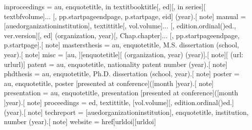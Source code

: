 \documentclass[letterpaper,10pt,english]{sphinxmanual}
\begin{document}
\begin{sphinxVerbatim}[commandchars=\\\{\}]
inproceedings = \PYGZlt{}au\PYGZgt{}, \PYGZbs{}enquote\PYGZob{}\PYGZlt{}title\PYGZgt{},\PYGZcb{} in \PYGZbs{}textit\PYGZob{}\PYGZlt{}booktitle\PYGZgt{}\PYGZcb{}[, \PYGZlt{}ed\PYGZgt{}][, in \PYGZlt{}series\PYGZgt{}][ \PYGZbs{}textbf\PYGZob{}\PYGZlt{}volume\PYGZgt{}\PYGZcb{}]...
        [, pp.\PYGZti{}\PYGZlt{}startpage\PYGZgt{}\PYGZhy{}\PYGZhy{}\PYGZlt{}endpage\PYGZgt{}\textbar{}, p.\PYGZti{}\PYGZlt{}startpage\PYGZgt{}\textbar{}, \PYGZlt{}eid\PYGZgt{}] (\PYGZlt{}year\PYGZgt{}).[ \PYGZlt{}note\PYGZgt{}]
manual = [\PYGZlt{}au\PYGZgt{}\textbar{}\PYGZlt{}ed\PYGZgt{}\textbar{}\PYGZlt{}organization\PYGZgt{}\textbar{}\PYGZlt{}institution\PYGZgt{}\textbar{}], \PYGZbs{}textit\PYGZob{}\PYGZlt{}title\PYGZgt{}\PYGZcb{}[, vol.\PYGZti{}\PYGZlt{}volume\PYGZgt{}]...
        [, \PYGZlt{}edition.ordinal()\PYGZgt{}\PYGZti{}ed.\textbar{}, ver.\PYGZti{}\PYGZlt{}version\PYGZgt{}][, \PYGZlt{}ed\PYGZgt{}] (\PYGZlt{}organization\PYGZgt{}, \PYGZlt{}year\PYGZgt{})[, Chap.\PYGZti{}\PYGZlt{}chapter\PYGZgt{}]...
        [, pp.\PYGZti{}\PYGZlt{}startpage\PYGZgt{}\PYGZhy{}\PYGZhy{}\PYGZlt{}endpage\PYGZgt{}\textbar{}, p.\PYGZti{}\PYGZlt{}startpage\PYGZgt{}].[ \PYGZlt{}note\PYGZgt{}]
mastersthesis = \PYGZlt{}au\PYGZgt{}, \PYGZbs{}enquote\PYGZob{}\PYGZlt{}title\PYGZgt{},\PYGZcb{} M.S. dissertation (\PYGZlt{}school\PYGZgt{}, \PYGZlt{}year\PYGZgt{}).[ \PYGZlt{}note\PYGZgt{}]
misc = [\PYGZlt{}au\PYGZgt{}, ][\PYGZbs{}enquote\PYGZob{}\PYGZlt{}title\PYGZgt{}\PYGZcb{}][ (\PYGZlt{}organization\PYGZgt{}, \PYGZlt{}year\PYGZgt{})\textbar{} (\PYGZlt{}year\PYGZgt{})].[ \PYGZlt{}note\PYGZgt{}][ (url: \PYGZbs{}url\PYGZob{}\PYGZlt{}url\PYGZgt{}\PYGZcb{})]
patent = \PYGZlt{}au\PYGZgt{}, \PYGZbs{}enquote\PYGZob{}\PYGZlt{}title\PYGZgt{},\PYGZcb{} \PYGZlt{}nationality\PYGZgt{} patent \PYGZlt{}number\PYGZgt{} (\PYGZlt{}year\PYGZgt{}).[ \PYGZlt{}note\PYGZgt{}]
phdthesis = \PYGZlt{}au\PYGZgt{}, \PYGZbs{}enquote\PYGZob{}\PYGZlt{}title\PYGZgt{},\PYGZcb{} Ph.D. dissertation (\PYGZlt{}school\PYGZgt{}, \PYGZlt{}year\PYGZgt{}).[ \PYGZlt{}note\PYGZgt{}]
poster = \PYGZlt{}au\PYGZgt{}, \PYGZbs{}enquote\PYGZob{}\PYGZlt{}title\PYGZgt{}\PYGZcb{}, poster [presented at \PYGZlt{}conference\PYGZgt{}]([\PYGZlt{}month\PYGZgt{} ]\PYGZlt{}year\PYGZgt{}).[ \PYGZlt{}note\PYGZgt{}]
presentation = \PYGZlt{}au\PYGZgt{}, \PYGZbs{}enquote\PYGZob{}\PYGZlt{}title\PYGZgt{}\PYGZcb{}, presentation [presented at \PYGZlt{}conference\PYGZgt{}]([\PYGZlt{}month\PYGZgt{} ]\PYGZlt{}year\PYGZgt{}).[ \PYGZlt{}note\PYGZgt{}]
proceedings = \PYGZlt{}ed\PYGZgt{}, \PYGZbs{}textit\PYGZob{}\PYGZlt{}title\PYGZgt{}\PYGZcb{}, [vol.\PYGZti{}\PYGZlt{}volume\PYGZgt{}][, \PYGZlt{}edition.ordinal()\PYGZgt{}\PYGZti{}ed.] (\PYGZlt{}year\PYGZgt{}).[ \PYGZlt{}note\PYGZgt{}]
techreport = [\PYGZlt{}au\PYGZgt{}\textbar{}\PYGZlt{}ed\PYGZgt{}\textbar{}\PYGZlt{}organization\PYGZgt{}\textbar{}\PYGZlt{}institution\PYGZgt{}\textbar{}], \PYGZbs{}enquote\PYGZob{}\PYGZlt{}title\PYGZgt{},\PYGZcb{} \PYGZlt{}institution\PYGZgt{}, \PYGZlt{}number\PYGZgt{} (\PYGZlt{}year\PYGZgt{}).[ \PYGZlt{}note\PYGZgt{}]
website = \PYGZbs{}href\PYGZob{}[\PYGZlt{}url\PYGZgt{}\textbar{}\PYGZlt{}doi\PYGZgt{}]\PYGZcb{}\PYGZob{}[\PYGZlt{}url\PYGZgt{}\textbar{}\PYGZlt{}doi\PYGZgt{}]\PYGZcb{}


\end{sphinxVerbatim}
\end{document}
